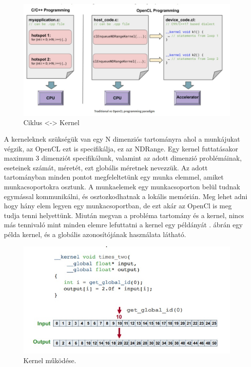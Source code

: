 \begin{figure}[h]
\centering
\includegraphics[scale=0.4]{images/loopvskernel.jpg}
\caption{Ciklus <-> Kernel \cite{opencl}}
\label{fig:loopVsKernel}
\end{figure}

A kerneleknek szükségük van egy N dimenziós tartományra ahol a munkájukat végzik, az OpenCL  ezt is specifikálja, ez az NDRange. Egy kernel futtatásakor maximum 3 dimenziót specifikálunk, valamint az adott dimenzió problémáinak, eseteinek számát, méretét, ezt globális méretnek nevezzük. Az adott tartományban minden pontot megfeleltetünk egy munka elemmel, amiket munkacsoportokra osztunk. A munkaelemek egy munkacsoporton belül tudnak egymással kommunikálni, és osztozkodhatnak a lokális memórián. Meg lehet adni hogy hány elem legyen egy munkacsoportban, de ezt akár az OpenCl is meg tudja tenni helyettünk. Miután megvan a probléma tartomány és a  kernel, nincs más tennivaló mint minden elemre lefuttatni a kernel egy példányát \cite{opencl_origin_range}.  ábrán egy példa kernel, és a globális azonosítójának használata látható.
 
\begin{figure}[h]
\centering
\includegraphics[scale=0.7]{images/kernel.jpg}
\caption{Kernel működése. \cite{opencl_origink}}
\label{fig:kernel}
\end{figure}

